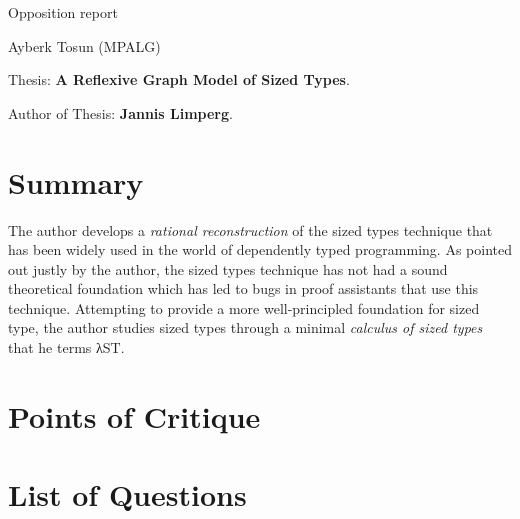 \documentclass[a4paper, 11pt]{article}
\begin{document}

\begin{center}
\Large Opposition report\\ 

\vspace{5pt}

\large Ayberk Tosun (MPALG)\\
\end{center}

\normalsize

Thesis: \textbf{A Reflexive Graph Model of Sized Types}.

Author of Thesis: \textbf{Jannis Limperg}.

\section{Summary}

The author develops a \emph{rational reconstruction} of the sized types technique that has
been widely used in the world of dependently typed programming. As pointed out justly by
the author, the sized types technique has not had a sound theoretical foundation which has
led to bugs in proof assistants that use this technique. Attempting to provide a more
well-principled foundation for sized type, the author studies sized types through a
minimal \emph{calculus of sized types} that he terms \textsf{λST}.


\section{Points of Critique}

\section{List of Questions}
\end{document}
